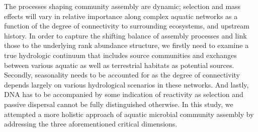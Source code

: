 \documentclass[12pt,a4paper]{article} %
\begin{document}
The processes shaping community assembly are dynamic; selection and mass effects will vary in relative importance along complex aquatic networks as a function of the degree of connectivity to surrounding ecosystems, and upstream history. In order to capture the shifting balance of assembly processes and link those to the underlying rank abundance structure, we firstly need to examine a true hydrologic continuum that includes source communities and exchanges between various aquatic as well as terrestrial habitats as potential sources. Secondly, seasonality needs to be accounted for as the degree of connectivity depends largely on various hydrological scenarios in these networks. And lastly, DNA has to be accompanied by some indication of reactivity as selection and passive dispersal cannot be fully distinguished otherwise. In this study, we attempted a more holistic approach of aquatic microbial community assembly by addressing the three aforementioned critical dimensions.

\end{document}
